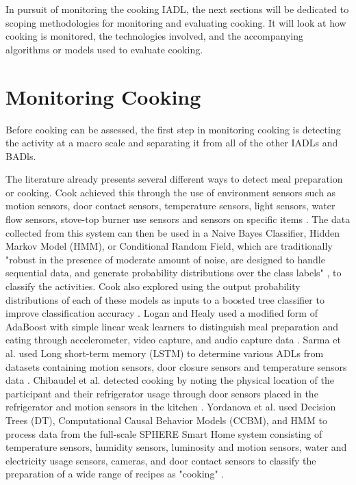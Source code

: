 In pursuit of monitoring the cooking IADL, the next sections will be dedicated to scoping methodologies for monitoring and evaluating cooking. It will look at how cooking is monitored, the technologies involved, and the accompanying algorithms or models used to evaluate cooking.

\section{Monitoring Cooking}\label{sec:monitoring-cooking}
Before cooking can be assessed, the first step in monitoring cooking is detecting the activity at a macro scale and separating it from all of the other IADLs and BADls. 

The literature already presents several different ways to detect meal preparation or cooking. Cook achieved this through the use of environment sensors such as motion sensors, door contact sensors, temperature sensors, light sensors, water flow sensors, stove-top burner use sensors and sensors on specific items \cite{cook_learning_2010}. The data collected from this system can then be used in a Naive Bayes Classifier, Hidden Markov Model (HMM), or Conditional Random Field, which are traditionally "robust in the presence of moderate amount of noise, are designed to handle sequential data, and generate probability distributions over the class labels" \cite{cook_learning_2010}, to classify the activities. Cook also explored using the output probability distributions of each of these models as inputs to a boosted tree classifier to improve classification accuracy \cite{cook_learning_2010}. Logan and Healy used a modified form of AdaBoost with simple linear weak learners to distinguish meal preparation and eating through accelerometer, video capture, and audio capture data \cite{logan_sensors_2006}. Sarma et al. used Long short-term memory (LSTM) to determine various ADLs from datasets containing motion sensors, door closure sensors and temperature sensors data \cite{sarma_activity_2019}. Chibaudel et al. detected cooking by noting the physical location of the participant and their refrigerator usage through door sensors placed in the refrigerator and motion sensors in the kitchen \cite{mokhtari_smart_2018}. Yordanova et al. used Decision Trees (DT), Computational Causal Behavior Models (CCBM), and HMM to process data from the full-scale SPHERE Smart Home system consisting of temperature sensors, humidity sensors, luminosity and motion sensors, water and electricity usage sensors, cameras, and door contact sensors to classify the preparation of a wide range of recipes as "cooking" \cite{yordanova_analysing_2019}.

